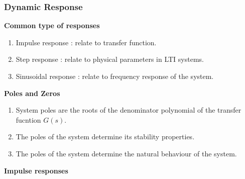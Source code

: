 \subsubsection{Dynamic Response}
\textbf{Common type of responses}
\begin{enumerate}
    \item Impulse response :  relate to transfer function.
    \item Step response : relate to physical parameters in LTI systems.
    \item Sinusoidal response : relate to frequency response of the system.
\end{enumerate}
\textbf{Poles and Zeros}
\begin{enumerate}
    \item System poles are the roots of the denominator polynomial of the transfer fucntion $G(s)$.
    \item The poles of the system determine its stability properties.
    \item The poles of the system determine the natural behaviour of the system.
\end{enumerate}
\textbf{Impulse responses}
